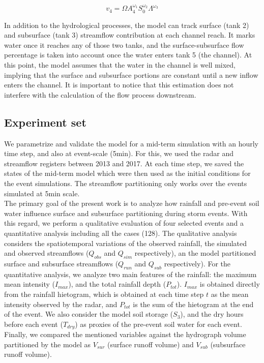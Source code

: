 \documentclass[preprint,12pt]{elsarticle}
\begin{document}
\begin{equation}
 v_4 = \Omega A_4^{\omega_1} S_0^{\omega_2} \Lambda^{\omega_3} 
    \label{eq:ocg}
\end{equation}

In addition to the hydrological processes, the model can track surface (tank 2) and subsurface (tank 3) streamflow contribution at each channel reach. It marks water once it reaches any of those two tanks, and the surface-subsurface flow percentage is taken into account once the water enters tank 5 (the channel).   At this point, the model assumes that the water in the channel is well mixed,  implying that the surface and subsurface portions are constant until a new inflow enters the channel.  It is important to notice that this estimation does not interfere with the calculation of the flow process downstream.\\ 

\subsection{Experiment set}

We parametrize and validate the model for a mid-term simulation with an hourly time step, and also at event-scale (5min).  For this, we used the radar and streamflow registers between 2013 and 2017.  At each time step, we saved the states of the mid-term model which were then used as the initial conditions for the event simulations.  The streamflow partitioning only works over the events simulated at 5min scale.\\

The primary goal of the present work is to analyze how rainfall and pre-event soil water influence surface and subsurface partitioning during storm events.  With this regard, we perform a qualitative evaluation of four selected events and a quantitative analysis including all the cases (128).  The qualitative analysis considers the spatiotemporal variations of the observed rainfall, the simulated and observed streamflows ($Q_{obs}$ and $Q_{sim}$ respectively), an the model partitioned surface and subsurface streamflows ($Q_{run}$ and $Q_{sub}$ respectively).  For the quantitative analysis, we analyze two main features of the rainfall: the maximum mean intensity ($I_{max}$), and the total rainfall depth ($P_{tot}$).  $I_{max}$ is obtained directly from the rainfall hietogram, which is obtained at each time step $t$ as the mean intensity observed by the radar, and $P_{tot}$ is the sum of the hietogram at the end of the event.  We also consider the model soil storage ($S_3$), and the dry hours before each event ($T_{dry}$) as proxies of the pre-event soil water for each event.   Finally, we compared the mentioned variables against the hydrograph volume partitioned by the model as $V_{sur}$ (surface runoff volume) and $V_{sub}$ (subsurface runoff volume).\\
\end{document}
